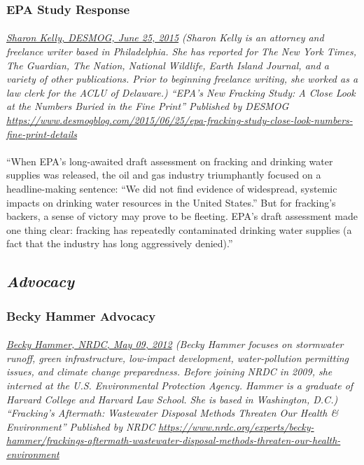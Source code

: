 \documentclass{article}
\begin{document}
\subsubsection{EPA Study Response}
\paragraph{}
\small
\textit{
\underline{Sharon Kelly, DESMOG,  June 25, 2015}
(Sharon Kelly is an attorney and freelance writer based in Philadelphia. She has reported for The New York Times, The Guardian, The Nation, National Wildlife, Earth Island Journal, and a variety of other publications. Prior to beginning freelance writing, she worked as a law clerk for the ACLU of Delaware.) “EPA's New Fracking Study: A Close Look at the Numbers Buried in the Fine Print” Published by DESMOG  
\url{https://www.desmogblog.com/2015/06/25/epa-fracking-study-close-look-numbers-fine-print-details}}
\normalsize

\paragraph{}
``When EPA’s long-awaited draft assessment on fracking and drinking water supplies was released, the oil and gas industry triumphantly focused on a headline-making sentence: “We did not find evidence of widespread, systemic impacts on drinking water resources in the United States.” But for fracking’s backers, a sense of victory may prove to be fleeting. EPA’s draft assessment made one thing clear: fracking has repeatedly contaminated drinking water supplies (a fact that the industry has long aggressively denied).”

\subsection{\emph{Advocacy}}

\subsubsection{Becky Hammer Advocacy}
\paragraph{}
\small
\textit{
\underline{Becky Hammer, NRDC, May 09, 2012}
(Becky Hammer focuses on stormwater runoff, green infrastructure, low-impact development, water-pollution permitting issues, and climate change preparedness. Before joining NRDC in 2009, she interned at the U.S. Environmental Protection Agency. Hammer is a graduate of Harvard College and Harvard Law School. She is based in Washington, D.C.) “Fracking's Aftermath: Wastewater Disposal Methods Threaten Our Health \& Environment” Published by NRDC 
\url{https://www.nrdc.org/experts/becky-hammer/frackings-aftermath-wastewater-disposal-methods-threaten-our-health-environment}}
\normalsize
\end{document}
